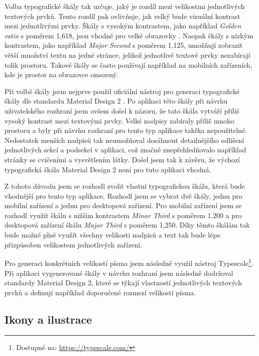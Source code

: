 Volba typografické škály tak určuje, jaký je rozdíl mezi velikostmi jednotlivých textových prvků. Tento rozdíl pak ovlivňuje, jak velký bude vizuální kontrast mezi jednotlivými prvky. Škály s vysokým kontrastem, jako například \textit{Golden ratio} s poměrem 1,618, jsou vhodné pro velké obrazovky \cite{TypographicScales}. Naopak škály s nízkým kontrastem, jako například \textit{Major Second} s poměrem 1,125, umožňují zobrazit větší množství textu na jedné stránce, jelikož jednotlivé textové prvky nezabírají tolik prostoru. Takové škály se často používají například na mobilních zařízeních, kde je prostor na obrazovce omezený.

Při volbě škály jsem nejprve použil oficiální nástroj pro generaci typografické škály dle standardu Material Design 2 \cite{MaterialDesign2TypeSystem}. Po aplikaci této škály při návrhu uživatelského rozhraní jsem ovšem došel k názoru, že tato škála vytváří příliš vysoký kontrast mezi textovými prvky. Velké nadpisy zabíraly příliš mnoho prostoru a byly při návrhu rozhraní pro tento typ aplikace takřka nepoužitelné. Nedostatek menších nadpisů tak neumožňoval dosáhnout detailnějšího odlišení jednotlivých sekcí a podsekcí v aplikaci, což značně znepřehledňovalo například stránky se cvičeními a vysvětlením látky. Došel jsem tak k závěru, že výchozí typografická škála Material Design 2 není pro tuto aplikaci vhodná.

Z tohoto důvodu jsem se rozhodl zvolit vlastní typografickou škálu, která bude vhodnější pro tento typ aplikace. Rozhodl jsem se vybrat dvě škály, jednu pro mobilní zařízení a jednu pro desktopová zařízení. Pro mobilní zařízení jsem se rozhodl využít škálu s nižším kontrastem \textit{Minor Third} s poměrem 1.200 a pro desktopová zařízení škálu \textit{Major Third} s poměrem 1,250. Díky těmto škálám tak bude možné plně využít všechny velikosti nadpisů a text tak bude lépe přizpůsoben velikostem jednotlivých zařízení. \cite{TypographicScales}

Pro generaci konkrétních velikostí písma jsem následně využil nástroj Typescale\footnote{Dostupné na: \href{https://typescale.com/}{https://typescale.com/}}. Při aplikaci vygenerované škály v návrhu rozhraní jsem následně dodržoval standardy Material Design 2, které se týkají vlastností jednotlivých textových prvků a definují například doporučené rozmezí velikostí písma.

\subsection{Ikony a ilustrace}

